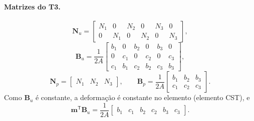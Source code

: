 \documentclass[11pt,a4paper]{article}
\begin{document}
\paragraph{Matrizes do T3.}
\begin{equation*}
\boxed{\mathbf N_u=\begin{bmatrix}
N_1&0&N_2&0&N_3&0\\
0&N_1&0&N_2&0&N_3
\end{bmatrix},}
\end{equation*}
\begin{equation*}
\boxed{\mathbf B_u=\frac{1}{2A}\begin{bmatrix}
b_1&0&b_2&0&b_3&0\\
0&c_1&0&c_2&0&c_3\\
c_1&b_1&c_2&b_2&c_3&b_3
\end{bmatrix},}
\end{equation*}
\begin{equation*}
\boxed{\mathbf N_p=\begin{bmatrix}N_1&N_2&N_3\end{bmatrix},\qquad
\mathbf B_p=\frac{1}{2A}\begin{bmatrix}
b_1&b_2&b_3\\
c_1&c_2&c_3
\end{bmatrix}.}
\end{equation*}
Como $\mathbf B_u$ é constante, a deformação é constante no elemento
(elemento CST), e
\begin{equation*}
\mathbf m^{\mathsf T}\mathbf B_u=\frac{1}{2A}\begin{bmatrix}b_1&c_1&b_2&c_2&b_3&c_3\end{bmatrix}.
\end{equation*}
\end{document}
